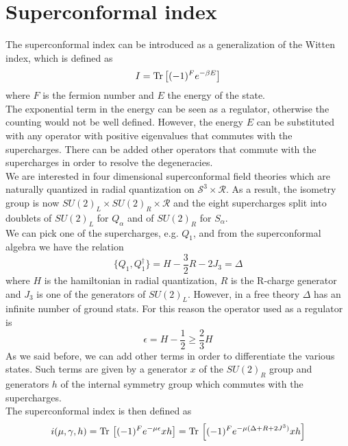 \section{Superconformal index}
The superconformal index can be introduced as a generalization of the Witten index, which is defined as 
\begin{equation}
I = \mathrm{Tr } \,{ \left[   (-1)^F e^{-\beta E}\right]}
\end{equation}
where $F$ is the fermion number and $E$ the energy of the state.\\
The exponential term in the energy can be seen as a regulator, otherwise the counting would not be well defined.
However, the energy $E$ can be substituted with any operator with positive eigenvalues that commutes with the supercharges. 
There can be added other operators that commute with the supercharges in order to resolve the degeneracies.
\\
We are interested in four dimensional superconformal field theories which are naturally quantized in radial quantization on $\mathcal{S}^3 \times \mathcal{R}$. 
As a result, the isometry group is now $SU(2)_L \times SU(2)_R \times \mathcal{R}$ and the eight supercharges split into doublets of $SU(2)_L$ for $Q_{\alpha}$ and of $SU(2)_R$ for $S_{\alpha}$.\\
We can pick one of the supercharges, e.g. $Q_1$, and from the superconformal algebra we have the relation
\begin{equation}
 \{Q_1, Q_1^{\dagger} \} = H - \frac{3}{2} R - 2 J_3 = \Delta
 \end{equation} 
 where $H$ is the hamiltonian in radial quantization, $R$ is the R-charge generator and $J_3$ is one of the generators of $SU(2)_L$. 
 However, in a free theory $\Delta$ has an infinite number of ground stats. 
 For this reason the operator used as a regulator is \cite{Romelsberger:2005eg}
 \begin{equation}
 	\epsilon = H - \frac{1}{2} \geq \frac{2}{3} H 
 \end{equation}
As we said before, we can add other terms in order to differentiate the various states.
Such terms are given by a generator $x $ of the $SU(2)_R$ group and generators $h$ of the internal symmetry group which commutes with the supercharges.\\
The superconformal index is then defined as 
\begin{equation}
 i( \mu, \gamma,h) =
  \mathrm{Tr } \,  \left[  (-1)^F e^{ - \mu \epsilon } x h   \right] = 
 \mathrm{Tr } \, \left[  (-1)^F
  e^{- \mu (\Delta + R + 2 J^3)}  x h   \right]
 \end{equation} 
